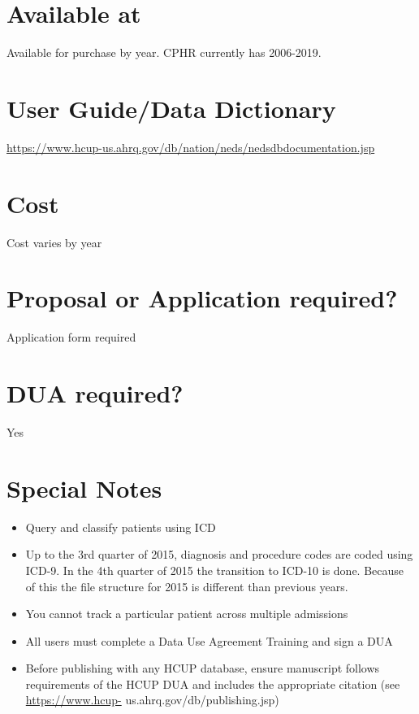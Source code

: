 \documentclass[
]{book}
\providecommand{\tightlist}{%
  \setlength{\itemsep}{0pt}\setlength{\parskip}{0pt}}
\begin{document}
\hypertarget{available-at-70}{%
\section{Available at}\label{available-at-70}}

Available for purchase by year. CPHR currently has 2006-2019.

\hypertarget{user-guidedata-dictionary-70}{%
\section{User Guide/Data Dictionary}\label{user-guidedata-dictionary-70}}

\url{https://www.hcup-us.ahrq.gov/db/nation/neds/nedsdbdocumentation.jsp}

\hypertarget{cost-70}{%
\section{Cost}\label{cost-70}}

Cost varies by year

\hypertarget{proposal-or-application-required-70}{%
\section{Proposal or Application required?}\label{proposal-or-application-required-70}}

Application form required

\hypertarget{dua-required-70}{%
\section{DUA required?}\label{dua-required-70}}

Yes

\hypertarget{special-notes-70}{%
\section{Special Notes}\label{special-notes-70}}

\begin{itemize}
\tightlist
\item
  Query and classify patients using ICD
\item
  Up to the 3rd quarter of 2015, diagnosis and procedure codes are coded using ICD-9. In the 4th quarter of 2015 the transition to ICD-10 is done. Because of this the file structure for 2015 is different than previous years.
\item
  You cannot track a particular patient across multiple admissions
\item
  All users must complete a Data Use Agreement Training and sign a DUA
\item
  Before publishing with any HCUP database, ensure manuscript follows requirements of the HCUP DUA and includes the appropriate citation (see \url{https://www.hcup-} us.ahrq.gov/db/publishing.jsp)
\end{itemize}
\end{document}

